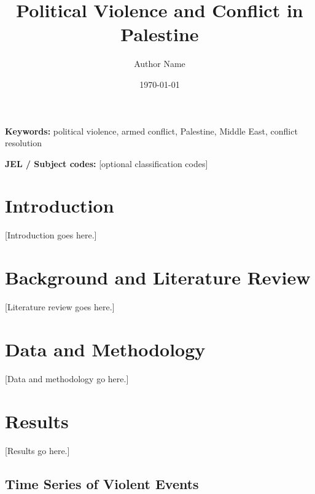 \documentclass[12pt, a4paper]{article}
\title{\Large\textbf{Political Violence and Conflict in Palestine}}
\author[1]{Author Name}
\affil[1]{ETH Zürich}
\date{\today}
\begin{document}
\maketitle
\thispagestyle{empty}

\vspace{1em}

\begin{abstract}
\end{abstract}

\noindent\textbf{Keywords:} political violence, armed conflict, Palestine, Middle East, conflict resolution

\vspace{1em}
\noindent\textbf{JEL / Subject codes:} [optional classification codes]

\newpage
\setcounter{page}{1}
\doublespacing

\section{Introduction}
\label{sec:intro}

[Introduction goes here.]

\section{Background and Literature Review}
\label{sec:lit}

[Literature review goes here.]

\section{Data and Methodology}
\label{sec:data}

[Data and methodology go here.]

\section{Results}
\label{sec:results}

[Results go here.]

\subsection{Time Series of Violent Events}
\end{document}
